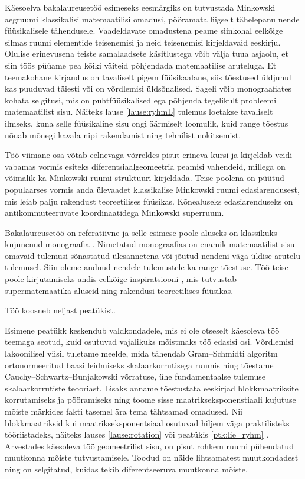 \documentclass[12pt,a4paper,oneside]{article}
\theoremstyle{plain}
\theoremstyle{definition}
\numberwithin{equation}{section}
\begin{document}
Käesoelva bakalaureusetöö esimeseks eesmärgiks on 
tutvustada Minkowski aeg\-ruumi klassikalisi matemaatilisi 
omadusi, pööramata liigselt tähelepanu nende füü\-sikalisele 
tähendusele. Vaadeldavate omadustena peame siinkohal 
eelkõige silmas ruumi elementide teisenemisi ja neid 
teisenemisi kirjeldavaid eeskirju. 
Olulise erinevusena teiste samalaadsete käsitlustega võib 
välja tuua asjaolu, et siin töös püüame pea kõiki väiteid 
põhjendada matemaatilise aruteluga. Et teemakohane kirjandus 
on tavaliselt pigem füüsikaalane, siis tõestused üldjuhul kas 
puuduvad täiesti või on võrdlemisi üldsõnalised. Sageli võib 
monograafiates kohata selgitusi, mis on puhtfüüsikalised ega 
põhjenda tegelikult probleemi matemaatilist \mbox{sisu}. Näiteks \mbox{lause}
\ref{lause:ryhmL} tulemus loetakse tavaliselt ilmseks, kuna 
selle füüsikaline sisu \mbox{ongi} äärmiselt loomulik, kuid range 
tõestus nõuab mõnegi kavala nipi rakendamist ning tehnilist 
nokitsemist. 

Töö viimane osa võtab eelnevaga võrreldes pisut erineva kursi 
ja kirjeldab \mbox{veidi} vabamas vormis esiteks diferentsiaalgeomeetria 
peamisi vahendeid, millega on võimalik ka Minkowski ruumi 
struktuuri kirjeldada. Teise poolena on püütud populaarses 
vormis anda ülevaadet klassikalise Minkowski ruumi 
edasiarendusest, mis leiab palju rakendust teoreetilises 
füüsikas. Kõnealuseks edasiarenduseks on antikommuteeruvate 
koordinaatidega Minkowski superruum.

Bakalaureusetöö on referatiivne ja selle esimese poole aluseks 
on klassikuks kuju\-nenud monograafia \cite{Naber}. Nimetatud monograafias
on enamik matemaatilist sisu omavaid tulemusi sõnastatud 
ülesannetena või jõutud nendeni väga üldise arutelu tulemusel. 
Siin oleme andnud nendele tulemustele ka range tõestuse. Töö 
teise poole kirjutamiseks andis eelkõige inspiratsiooni 
\cite{Super}, mis tutvustab super\-matemaatika aluseid ning 
rakendusi teoreetilises füüsikas.

Töö koosneb neljast peatükist.

Esimene peatükk keskendub valdkondadele, mis ei ole otseselt 
käesoleva töö \mbox{teemaga} seotud, kuid osutuvad vajalikuks 
mõistmaks töö edasisi osi. Võrdlemisi lakoonilisel 
viisil tuletame meelde, mida tähendab Gram--Schmidti algoritm 
ortonormeeritud baasi leidmiseks skalaarkorrutisega ruumis ning 
tõestame Cauchy--Schwartz--Bunjakowski võrratuse, ühe 
fundamentaalse tulemuse skalaarkorrutiste teooriast. Lisaks 
anname tõestustata eeskirjad blokkmaatriksite korrutamiseks 
ja pööramiseks ning toome sisse maatrikseksponenstiaali kujutuse 
mõiste märkides fakti tasemel ära tema tähtsamad omadused. 
Nii blokkmaatriksid kui maatriks\-eksponentsiaal osutuvad hiljem 
väga praktilisteks tööriistadeks, näiteks lauses 
\ref{lause:rotation} või peatükis \ref{ptk:lie_ryhm} 
. Arvestades käesoleva 
töö geomeetrilist sisu, on pisut rohkem ruumi pühendatud 
muutkonna mõiste tutvustamisele. Toodud on näide lihtsamatest 
muutkondadest ning on selgitatud, kuidas tekib diferentseeruva 
\mbox{muutkonna} mõiste.
\end{document}
